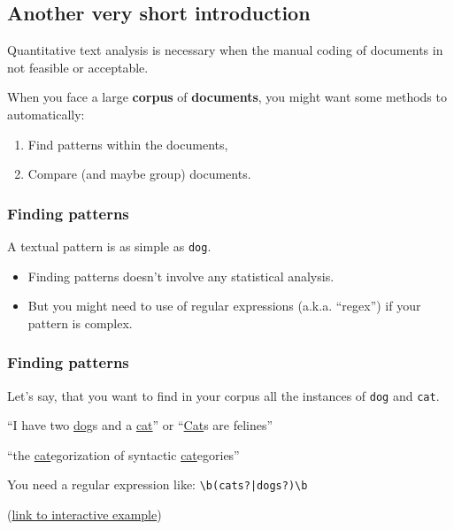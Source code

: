 \documentclass[serif, aspectratio=169]{beamer}
\begin{document}
\subsection{Another very short introduction}

\begin{frame}

Quantitative text analysis is necessary when the manual coding of documents in not feasible or acceptable. 

When you face a large \textbf{corpus} of \textbf{documents}, you might want some methods to automatically:

\begin{enumerate}

\item Find patterns within the documents,

\item Compare (and maybe group) documents.

\end{enumerate}

\end{frame}

\begin{frame}[fragile]
\frametitle{Finding patterns}

A textual pattern is as simple as \texttt{dog}.

\begin{itemize}

\item Finding patterns doesn't involve any statistical analysis.

\item But you might need to use of regular expressions (a.k.a. \enquote{regex}) if your pattern is complex.

\end{itemize}

\end{frame}

\begin{frame}[fragile]
\frametitle{Finding patterns}

Let's say, that you want to find in your corpus all the instances of \texttt{dog} and \texttt{cat}.

\begin{description}

\item<1->[You want to find] \enquote{I have two \underline{dog}s and a \underline{cat}} or \enquote{\underline{Cat}s are felines}

\item<2->[But you don't want to find]  \enquote{the \underline{cat}egorization of syntactic \underline{cat}egories}

\item<3-> You need a regular expression like: {\LARGE\verb=\b(cats?|dogs?)\b=} 

\end{description}

{\tiny (\href{https://regexr.com/3oqld}{link to interactive example})}

\end{frame}
\end{document}

